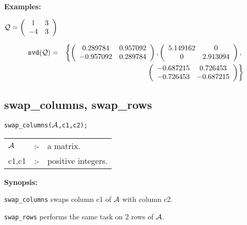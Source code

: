 {\bf Examples:}

\begin{flushleft}
\hspace*{0.175in}
\begin{math}
{\cal Q} = \left( \begin{array}{cc} 1 & 3 \\ -4 & 3
\end{array} \right)
\end{math}
\end{flushleft}

\begin{eqnarray}
\hspace*{0.1in}
{\tt svd({\cal Q})} & = &
\left\{
        \left( \begin{array}{cc} 0.289784 & 0.957092 \\ -0.957092 &
0.289784 \end{array} \right), \left( \begin{array}{cc} 5.149162 & 0 \\
0 & 2.913094 \end{array} \right), \right. \nonumber \\ & & \left. \: \;
\, \left( \begin{array}{cc} -0.687215 & 0.726453 \\ -0.726453 &
-0.687215 \end{array} \right)
\right\} \nonumber
\end{eqnarray}


\subsection{swap\_columns, swap\_rows}


\hspace*{0.175in} {\tt swap\_columns(${\cal A}$,c1,c2);}

\hspace*{0.1in}
\begin{tabular}{l l l}
${\cal A}$ &:-& a matrix. \\
c1,c1      &:-& positive integers.
\end{tabular}

{\bf Synopsis:} %

\hspace*{0.175in}
{\tt swap\_columns} swaps column c1 of ${\cal A}$ with column c2.

\hspace*{0.175in} {\tt swap\_rows} performs the same task on 2 rows of
                ${\cal A}$.

